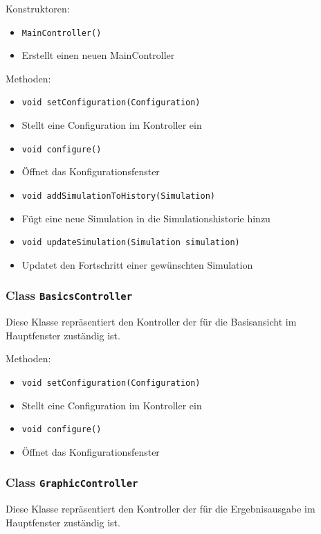 \documentclass[parskip=full,11pt]{scrartcl}
\begin{document}
Konstruktoren:
\begin{itemize}\itemsep -10pt
\item \texttt{MainController()}
\item[] Erstellt einen neuen MainController
\end{itemize}

Methoden:
\begin{itemize}\itemsep -10pt
\item \texttt{void setConfiguration(Configuration)}
\item[] Stellt eine Configuration im Kontroller ein


\item \texttt{void configure()}
\item[] Öffnet das Konfigurationsfenster

\item \texttt{void addSimulationToHistory(Simulation)}
\item[] Fügt eine neue Simulation in die Simulationshistorie hinzu

\item \texttt{void updateSimulation(Simulation simulation)}
\item[] Updatet den Fortschritt einer gewünschten Simulation
\end{itemize}

\subsubsection{Class \texttt{BasicsController}}
Diese Klasse repräsentiert den Kontroller der für die Basisansicht im Hauptfenster zuständig ist.

Methoden:
\begin{itemize}\itemsep -10pt
\item \texttt{void setConfiguration(Configuration)}
\item[] Stellt eine Configuration im Kontroller ein


\item \texttt{void configure()}
\item[] Öffnet das Konfigurationsfenster
\end{itemize}

\subsubsection{Class \texttt{GraphicController}}
Diese Klasse repräsentiert den Kontroller der für die Ergebnisausgabe im Hauptfenster zuständig ist.
\end{document}
